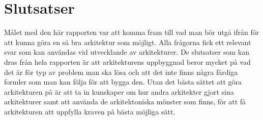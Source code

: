 \section{Slutsatser}
Målet med den här rapporten var att komma fram till vad man bör utgå ifrån för att kunna göra en så bra arkitektur som möjligt. Alla frågorna fick ett relevant svar som kan användas vid utvecklande av arkitekturer. De slutsatser som kan dras från hela rapporten är att arkitekturens uppbyggnad beror mycket på vad det är för typ av problem man ska lösa och att det inte finns några färdiga formler som man kan följa för att bygga den. Utan det bästa sättet att göra arkitekturen på är att ta in kunskaper om hur andra arkitekter gjort sina arkitekturer samt att använda de arkitektoniska mönster som finns, för att få arkitekturen att uppfylla kraven på bästa möjliga sätt.


